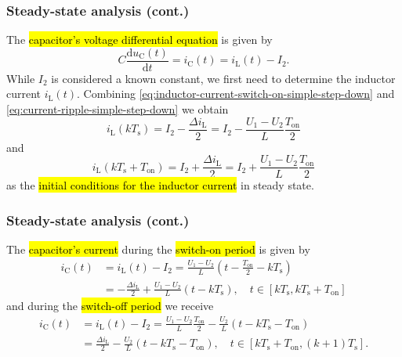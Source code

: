 \begin{frame}
    \frametitle{Steady-state analysis (cont.)}
     The \hl{capacitor's voltage differential equation} is given by
    \begin{equation}
        C \frac{\mathrm{d}u_\mathrm{C}(t)}{\mathrm{d}t} = i_\mathrm{C}(t) = i_\mathrm{L}(t) - I_2.
        \label{eq:capacitor-voltage-differential-equation-step-down-converter}
    \end{equation}
    While $I_2$ is considered a known constant, we first need to determine the inductor current $i_\mathrm{L}(t)$. Combining \eqref{eq:inductor-current-switch-on-simple-step-down} and \eqref{eq:current-ripple-simple-step-down} we obtain
    \begin{equation}
         i_\mathrm{L}(k T_\mathrm{s})  = I_2 - \frac{\Delta i_\mathrm{L}}{2} = I_2 - \frac{U_1 - U_2}{L} \frac{T_\mathrm{on}}{2}
    \end{equation}
    and
    \begin{equation}
        i_\mathrm{L}(k T_\mathrm{s} + T_\mathrm{on})  = I_2 + \frac{\Delta i_\mathrm{L}}{2} = I_2 + \frac{U_1 - U_2}{L} \frac{T_\mathrm{on}}{2}
   \end{equation}
    as the \hl{initial conditions for the inductor current} in steady state. 
\end{frame}

\begin{frame}
    \frametitle{Steady-state analysis (cont.)}
     The \hl{capacitor's current} during the \hl{switch-on period} is given by
    \begin{equation}
        \begin{split}
            i_\mathrm{C}(t) &= i_\mathrm{L}(t) - I_2 = \frac{U_1-U_2}{L} (t - \frac{T_\mathrm{on}}{2}-k T_\mathrm{s})\\
                            &= -\frac{\Delta i_\mathrm{L}}{2} + \frac{U_1-U_2}{L} (t -k T_\mathrm{s}), \quad t\in [k T_\mathrm{s}, k T_\mathrm{s} + T_\mathrm{on}]
        \end{split}
        \label{eq:capacitor-current-switch-on-step-down-converter}
    \end{equation}
    and during the \hl{switch-off period} we receive
    \begin{equation}
        \begin{split}
            i_\mathrm{C}(t) &= i_\mathrm{L}(t) - I_2 = \frac{U_1 - U_2}{L} \frac{T_\mathrm{on}}{2} -\frac{U_2}{L} (t - k T_\mathrm{s} - T_\mathrm{on})\\
                            &= \frac{\Delta i_\mathrm{L}}{2} - \frac{U_2}{L} (t - k T_\mathrm{s} - T_\mathrm{on}), \quad t\in [k T_\mathrm{s} + T_\mathrm{on}, (k+1) T_\mathrm{s}].
        \end{split}
        \label{eq:capacitor-current-switch-off-step-down-converter}
    \end{equation}
\end{frame}


